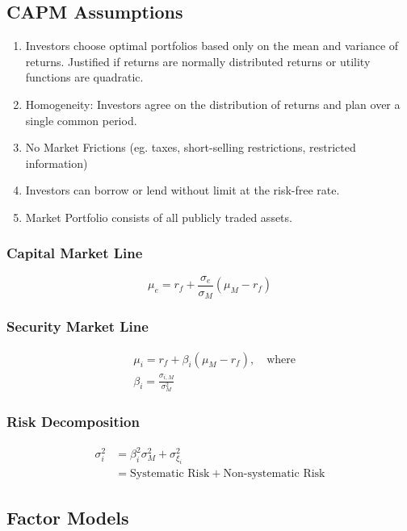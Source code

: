 \documentclass[11pt]{article}
\begin{document}
	\subsection{CAPM Assumptions}
	\begin{enumerate}
		\item Investors choose optimal portfolios based only on the mean and variance of returns. Justified if returns are normally distributed returns or utility functions are quadratic.
		\item Homogeneity: Investors agree on the distribution of returns and plan over a single common period.
		\item No Market Frictions (eg. taxes, short-selling restrictions, restricted information)
		\item Investors can borrow or lend without limit at the risk-free rate.
		\item Market Portfolio consists of all publicly traded assets.
	\end{enumerate}
	\subsubsection{Capital Market Line}
	\[	\mu_{e} = r_{f} + \frac{\sigma_{e}}{\sigma_{M}}(\mu_{M} - r_{f})\]
	\subsubsection{Security Market Line}
	
	\begin{align*}
	&\mu_i = r_f + \beta_i (\mu_M - r_f), \quad\text{where} \\[4pt]
	&\beta_i = \frac{\sigma_{i, M}}{\sigma_{M}^2}
	\end{align*}	
	\subsubsection{Risk Decomposition}
	\begin{align*}
		\sigma_i^2 & = \beta_i^2 \sigma_M^2 + \sigma_{\xi_{i}}^2 \\
		& = \text{Systematic Risk} + \text{Non-systematic Risk}
	\end{align*}	
	\subsection{Factor Models}
\end{document}
